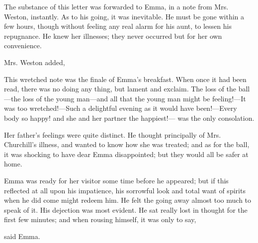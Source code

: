 The substance of this letter was forwarded to Emma, in a note from Mrs. Weston, instantly. As to his going, it was inevitable. He must be gone within a few hours, though without feeling any real alarm for his aunt, to lessen his repugnance. He knew her illnesses; they never occurred but for her own convenience.

Mrs. Weston added, 

This wretched note was the finale of Emma's breakfast. When once it had been read, there was no doing any thing, but lament and exclaim. The loss of the ball---the loss of the young man---and all that the young man might be feeling!---It was too wretched!---Such a delightful evening as it would have been!---Every body so happy! and she and her partner the happiest!--- was the only consolation.

Her father's feelings were quite distinct. He thought principally of Mrs. Churchill's illness, and wanted to know how she was treated; and as for the ball, it was shocking to have dear Emma disappointed; but they would all be safer at home.

Emma was ready for her visitor some time before he appeared; but if this reflected at all upon his impatience, his sorrowful look and total want of spirits when he did come might redeem him. He felt the going away almost too much to speak of it. His dejection was most evident. He sat really lost in thought for the first few minutes; and when rousing himself, it was only to say,


 said Emma. 




